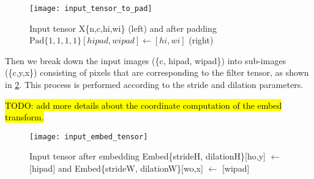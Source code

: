 {}
\begin{figure}[!h]
  \centering
  \texttt{[image: input\_tensor\_to\_pad]}

  \caption{Input tensor X\{n,c,hi,wi\} (left) and
    after padding $\text{Pad}\{1,1,1,1\}[hipad,wipad] \leftarrow [hi,wi]$ (right)}
  \label{fig:input_tensor_to_pad}
\end{figure}



Then we break down the input images (\{c, hipad, wipad\}) into sub-images (\{c,y,x\})
consisting of pixels that are corresponding to the filter tensor, as shown in
\Fig \ref{fig:input_embed_tensor}.
This process is performed according to the stride and dilation parameters.

\hl{TODO: add more details about the coordinate computation of the embed transform.}

\begin{figure}[!h]
  \centering
  \texttt{[image: input\_embed\_tensor]}
  \caption{Input tensor after embedding Embed\{strideH, dilationH\}[ho,y] $\leftarrow$ [hipad] and Embed\{strideW, dilationW\}[wo,x] $\leftarrow$ [wipad]}
  \label{fig:input_embed_tensor}
\end{figure}

